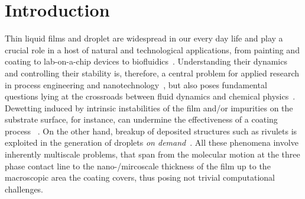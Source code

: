 \documentclass[twoside,twocolumn,9pt]{article}
\begin{document}
\section{Introduction}
\label{sec:intro}
Thin liquid films and droplet are widespread in our every day life and play a crucial role
in a host of natural and technological applications, from painting and coating to lab-on-a-chip devices to biofluidics~\cite{degennesCapillarityWettingPhenomena2004, ronsinPhaseFieldSimulationsMorphology2022,fockeLabonaFoilMicrofluidicsThin2010}.
Understanding their dynamics and controlling their stability is, therefore, a central problem for applied research in process engineering and nanotechnology~\cite{singhInkjetPrintingProcess2010, quereFluidCoatingFiber1999, utadaDrippingJettingDrops2007}, but also poses fundamental questions lying at the crossroads between fluid dynamics and chemical physics~\cite{oronLongscaleEvolutionThin1997, beckerComplexDewettingScenarios2003, thielePatternedDepositionMoving2014, wilczekSlidingDropsEnsemble2017, peschkaSignaturesSlipDewetting2019}.
Dewetting induced by intrinsic instabilities of the film and/or impurities on 
the substrate surface, for instance, can undermine the effectiveness of a coating process
~\cite{bonnWettingSpreading2009, chenWrinklingInstabilitiesPolymer2012}. 
On the other hand, breakup of deposited structures such as rivulets is exploited
in the generation of droplets {\it on demand}~\cite{}.
All these phenomena involve inherently multiscale problems, that span from the molecular motion at the three phase contact line to the nano-/mircoscale thickness of the film up to the macroscopic area the coating covers, thus posing not trivial computational challenges.
\end{document}
